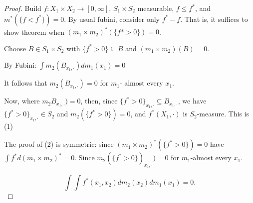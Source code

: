 \begin{proof}
	Build $f : X_1 \times X_2 \to [0,\infty]$,  $S_1 \times S_2$ measurable, $f \leq f^*$, and
	$m^*(\{ f < f^* \}) = 0$.
	By usual fubini, consider only  $f^* - f$.
	That is, it suffices to show theorem when $(m_1 \times m_2)^* (\{ f*>0 \}) =0$.

	Choose  $B \in S_1 \times S_2$ with $\{f^* > 0 \} \subseteq B$ and $(m_1 \times m_2 ) (B) = 0$.

	By Fubini:
	 $\int m_2 (B_{x_1,\cdot}) dm_1 (x_1) = 0$

	 It follows that $m_2(B_{x_1, \cdot}) = 0$ for $m_1$- almost every $x_1$.


	 Now, where $m_2 B_{x_1, \cdot}) = 0$, then, since $\{ f^* > 0 \}_{x_1,\cdot} \subseteq B_{x_1, \cdot}$, 
	 we have
	 $\{f^* > 0 \}_{x_1, \cdot} \in S_2$ and $m_2 (\{ f^* > 0\})=0$, and  $f^*(X_1, \cdot)$ is $S_2$-measure.
	 This is (1)

	 The proof of (2) is symmetric:
	 since $(m_1\times m_2)^*(\{ f^* > 0 \}) = 0$ have  $\int f^* d(m_1 \times m_2)^* = 0$.
	 Since  $m_2(\{f^* >0 \})_{x_1, \cdot}) = 0$ for $m_1$-almost every $x_1$.

	 \[
	 	\int \int f^* (x_1, x_2) dm_2 (x_2) dm_1 (x_1) = 0.
	 \] 
\end{proof}

